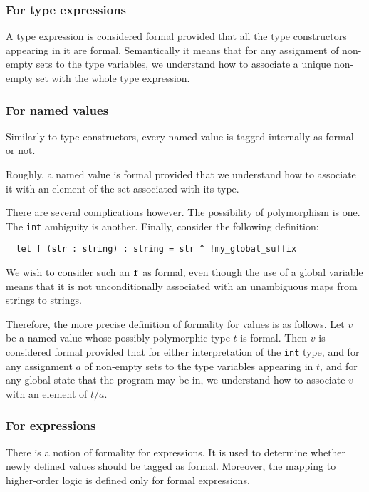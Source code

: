\documentclass[11pt]{article}
\begin{document}
\subsubsection{For type expressions}

A type expression is considered formal provided that all the type
constructors appearing in it are formal. Semantically it means that
for any assignment of non-empty sets to the type variables, we
understand how to associate a unique non-empty set with the whole type
expression.

\subsubsection{For named values}

Similarly to type constructors, every named value is tagged internally
as formal or not.

Roughly, a named value is formal provided that we understand how to
associate it with an element of the set associated with its type.

There are several complications however. The possibility of polymorphism is one.
The {\tt int} ambiguity is another. Finally, consider the following definition:
\begin{verbatim}
  let f (str : string) : string = str ^ !my_global_suffix
\end{verbatim}
We wish to consider such an $\tt f$ as formal, even though the use of
a global variable means that it is not unconditionally associated with
an unambiguous maps from strings to strings.

Therefore, the more precise definition of formality for values is as
follows. Let $v$ be a named value whose possibly polymorphic type $t$
is formal. Then $v$ is considered formal provided that for either
interpretation of the {\tt int} type, and for any assignment $a$ of
non-empty sets to the type variables appearing in $t$, and for any
global state that the program may be in, we understand how to associate $v$ 
with an element of $t/a$.

\subsubsection{For expressions}

There is a notion of formality for expressions. It is used to
determine whether newly defined values should be tagged as formal.
Moreover, the mapping to higher-order logic is defined only for formal
expressions.
\end{document}
